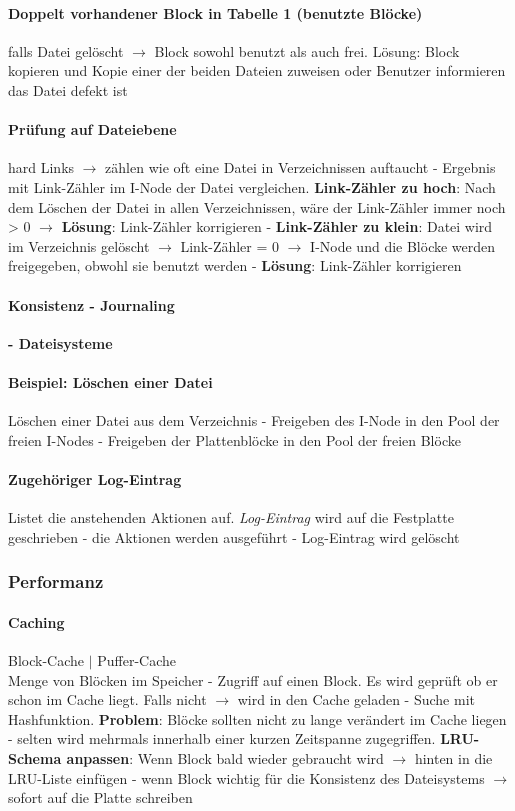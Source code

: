 \documentclass[11pt,a4paper,landscape]{article}
\begin{document}
\begin{multicols*}{3}
	\paragraph{Doppelt vorhandener Block in Tabelle 1 (benutzte Blöcke)} falls Datei gelöscht $\rightarrow$ Block sowohl benutzt als auch frei. Lösung: Block kopieren und Kopie einer der beiden Dateien zuweisen oder Benutzer informieren das Datei defekt ist
	\paragraph{Prüfung auf Dateiebene} hard Links $\rightarrow$ zählen wie oft eine Datei in Verzeichnissen auftaucht - Ergebnis mit Link-Zähler im I-Node der Datei vergleichen. \textbf{Link-Zähler zu hoch}: Nach dem Löschen der Datei in allen Verzeichnissen, wäre der Link-Zähler immer noch > 0 $\rightarrow$ \textbf{Lösung}: Link-Zähler korrigieren - \textbf{Link-Zähler zu klein}: Datei wird im Verzeichnis gelöscht $\rightarrow$ Link-Zähler = 0 $\rightarrow$ I-Node und die Blöcke werden freigegeben, obwohl sie benutzt werden - \textbf{Lösung}: Link-Zähler korrigieren
	\paragraph{Konsistenz - Journaling} \textbf{- Dateisysteme}
	\paragraph{Beispiel: Löschen einer Datei} Löschen einer Datei aus dem Verzeichnis - Freigeben des I-Node in den Pool der freien I-Nodes - Freigeben der Plattenblöcke in den Pool der freien Blöcke
	\paragraph{Zugehöriger Log-Eintrag} Listet die anstehenden Aktionen auf. \textit{Log-Eintrag} wird auf die Festplatte geschrieben - die Aktionen werden ausgeführt - Log-Eintrag wird gelöscht
	\subsubsection{Performanz}
	\paragraph{Caching} Block-Cache $\vert$ Puffer-Cache\\
	Menge von Blöcken im Speicher - Zugriff auf einen Block. Es wird geprüft ob er schon im Cache liegt. Falls nicht $\rightarrow$ wird in den Cache geladen - Suche mit Hashfunktion. \textbf{Problem}: Blöcke sollten nicht zu lange verändert im Cache liegen - selten wird mehrmals innerhalb einer kurzen Zeitspanne zugegriffen. \textbf{LRU-Schema anpassen}: Wenn Block bald wieder gebraucht wird $\rightarrow$ hinten in die LRU-Liste einfügen - wenn Block wichtig für die Konsistenz des Dateisystems $\rightarrow$ sofort auf die Platte schreiben

\end{multicols*}
\end{document}
